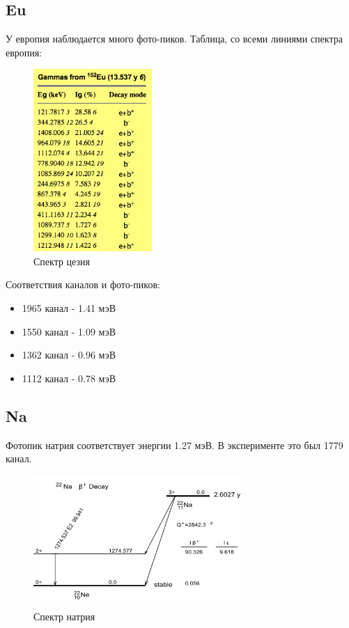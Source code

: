 \documentclass[a4paper,12pt]{article} %
\begin{document}
		\subsection*{Eu}
			У европия наблюдается много фото-пиков.
			Таблица, со всеми линиями спектра европия:
			\begin{figure}[h!]
				\includegraphics[width=0.4\textwidth]{img/152Eu.jpg}
				\centering
				\caption{Спектр цезия}
			\end{figure}\par
			Соответствия каналов и фото-пиков:
			\begin{itemize}
				\item 1965 канал - 1.41 мэВ
				\item 1550 канал - 1.09 мэВ
				\item 1362 канал - 0.96 мэВ
				\item 1112 канал - 0.78 мэВ
			\end{itemize}
		
		\subsection*{Na}
			Фотопик натрия соответствует энергии 1.27 мэВ.
			В эксперименте это был 1779 канал.
			\begin{figure}[h!]
				\includegraphics[width=0.7\textwidth]{img/Na-22-decay.png}
				\centering
				\caption{Спектр натрия}
			\end{figure}\par
	\newpage
\end{document}
